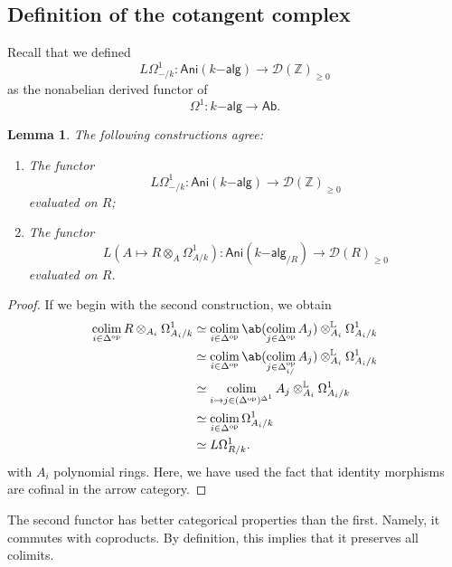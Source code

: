 \documentclass[10pt, oneside]{memoir}
\newtheorem{lem}[thm]{Lemma}
\theoremstyle{definition}
\theoremstyle{remark}
\theoremstyle{plain}
\theoremstyle{definition}
\theoremstyle{remark}
\newcommand{\Z}{\mathbb{Z}}
\renewcommand{\L}{\mathbb{L}}
\newcommand{\mc}[1]{\mathcal{#1}}
\newcommand{\ms}[1]{\mathsf{#1}}
\newcommand{\1}{\mathbf{1}}
\newcommand{\2}{\mathbf{2}}
\newcommand{\3}{\mathbf{3}}
\DeclareMathOperator{\op}{op}
\DeclareMathOperator*{\colim}{colim}
\begin{document}
\subsection{Definition of the cotangent complex}%
\label{sub:Definition of the cotangent complex}

Recall that we defined
\[ L \Omega^1_{-/k} \colon \ms{Ani}(k\ms{-alg}) \to \mc{D}(\Z)_{\geq 0} \] as the nonabelian derived functor of
\[ \Omega^1 \colon k\ms{-alg} \to \ms{Ab}. \]

\begin{lem}
    The following constructions agree:
    \begin{enumerate}
        \item The functor 
        \[ L \Omega^1_{-/k} \colon \ms{Ani}(k\ms{-alg}) \to \mc{D}(\Z)_{\geq 0} \] evaluated on $R$;
        \item The functor 
        \[ L (A \mapsto R \otimes_A \Omega^1_{A/k}) \colon \ms{Ani}(k\ms{-alg}_{/R}) \to \mc{D}(R)_{\geq 0} \]
        evaluated on $R$.
    \end{enumerate}
\end{lem}

\begin{proof}
    If we begin with the second construction, we obtain
    \begin{align*}
        \colim_{i \in \Delta^{\op}} R \otimes_{A_i}\Omega^1_{A_i/k} &\simeq \colim_{i \in \Delta^{\op}} \ab(\colim_{j \in \Delta^{\op}} A_j) \otimes^{\L}_{A_i} \Omega^1_{A_i/k} \\
        &\simeq \colim_{i \in \Delta^{\op}} \ab(\colim_{j \in \Delta^{\op}_{i/}} A_j) \otimes_{A_i}^{\L} \Omega^1_{A_i/k} \\
        &\simeq \colim_{i \to j \in (\Delta^{\op})^{\Delta^1}} A_j \otimes_{A_i}^{\L} \Omega^1_{A_i/k} \\
        &\simeq \colim_{i \in \Delta^{\op}} \Omega^1_{A_i/k} \\
        &\simeq L \Omega^1_{R/k}.
    \end{align*}
    with $A_i$ polynomial rings. Here, we have used the fact that identity morphisms are cofinal in the arrow category.
\end{proof}

The second functor has better categorical properties than the first. Namely, it commutes with coproducts. By definition, this implies that it preserves all colimits.
\end{document}
